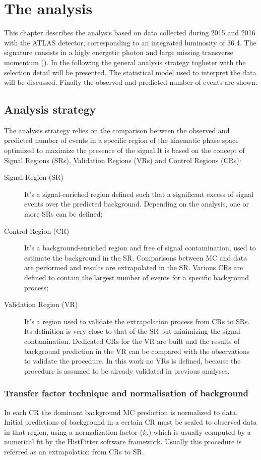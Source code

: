 \chapter{The \mph analysis}
\label{chapt:mph}
\lettrine{T}{}his chapter describes the \mph analysis based on data collected during 2015 and 2016 with the ATLAS detector, corresponding to an integrated luminosity of \SI{36.4}{\ifb}.
The \mph signature consists in a higly energetic photon and large missing transverse momentum (\met). In the following the general analysis strategy togheter with the selection detail will be presented. The statistical model used to interpret the data will be discussed. Finally the observed and predicted number of events are shown.

\section{Analysis strategy}
The \mph analysis strategy relies on the comparison between the observed and predicted number of events in a specific region of the kinematic phase space optimized to maximize the presence of the signal.It is based on the concept of Signal Regions (SRs), Validation Regions (VRs) and Control Regions (CRs):
\begin{description}
\item[Signal Region (SR)] It's a signal-enriched region defined such that a significant excess of signal events over the predicted background. Depending on the analysis, one or more SRs can be defined;
\item[Control Region (CR)] It's a background-enriched region and free of signal contamination, used to estimate the background in the SR. Comparisons between MC and data are performed and results are extrapolated in the SR. Various CRs are defined to contain the largest number of events for a specific background process;
\item[Validation Region (VR)] It's a region used to validate the extrapolation process from CRs to SRs. Its definition is very close to that of the SR but minimizing the signal contamination. Dedicated CRs for the VR are built and the results of background prediction in the VR can be compared with the observations to validate the procedure.
In this work no VRs is defined, because the procedure is assumed to be already validated in previous analyses.
\end{description}

\subsection{Transfer factor technique and normalisation of background}
\label{sec:kfactor}
In each CR the dominant background MC prediction is normalized to data. Initial predictions of background in a certain CR must be scaled to observed data in that region, using a normalization factor ($k_{i}$) which is usually computed by a numerical fit by the HistFitter software framework. Usually this procedure is referred as an extrapolation from CRs to SR.

